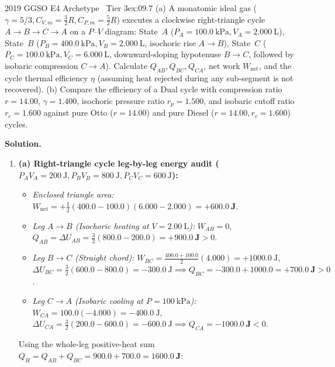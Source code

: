 \begin{workedexample}{2019 GGSO E4 Archetype \textbar\ Tier 3}{ex:09.7}
(a) A monatomic ideal gas ($\gamma = 5/3, C_{V,m} = \frac{3}{2}R, C_{P,m} = \frac{5}{2}R$) executes a clockwise right-triangle cycle $A\to B\to C\to A$ on a $P$--$V$ diagram: State~$A$ ($P_A = \SI{100.0}{\kilo\pascal}, V_A = \SI{2.000}{\liter}$), State~$B$ ($P_B = \SI{400.0}{\kilo\pascal}, V_B = \SI{2.000}{\liter}$, isochoric rise $A\to B$), State~$C$ ($P_C = \SI{100.0}{\kilo\pascal}, V_C = \SI{6.000}{\liter}$, downward-sloping hypotenuse $B\to C$, followed by isobaric compression $C\to A$). Calculate $Q_{AB}, Q_{BC}, Q_{CA}$, net work $W_{\mathrm{net}}$, and the cycle thermal efficiency $\eta$ (assuming heat rejected during any sub-segment is not recovered).
(b) Compare the efficiency of a Dual cycle with compression ratio $r = 14.00$, $\gamma = 1.400$, isochoric pressure ratio $r_p = 1.500$, and isobaric cutoff ratio $r_c = 1.600$ against pure Otto ($r=14.00$) and pure Diesel ($r=14.00, r_c=1.600$) cycles.
\par\smallskip\noindent
\textbf{Solution.}
\begin{enumerate}
  \item \textbf{(a) Right-triangle cycle leg-by-leg energy audit ($P_A V_A = \SI{200}{\joule}, P_B V_B = \SI{800}{\joule}, P_C V_C = \SI{600}{\joule}$):}
  \begin{itemize}
    \item \emph{Enclosed triangle area:} $W_{\mathrm{net}} = +\frac{1}{2}(400.0 - 100.0)(6.000 - 2.000) = \mathbf{+\SI{600.0}{\joule}}$.
    \item \emph{Leg $A\to B$ (Isochoric heating at $V=\SI{2.00}{\liter}$):} $W_{AB} = 0$, $Q_{AB} = \Delta U_{AB} = \frac{3}{2}(800.0 - 200.0) = \mathbf{+\SI{900.0}{\joule}} > 0$.
    \item \emph{Leg $B\to C$ (Straight chord):} $W_{BC} = \frac{400.0+100.0}{2}(4.000) = +\SI{1000.0}{\joule}$, $\Delta U_{BC} = \frac{3}{2}(600.0 - 800.0) = -\SI{300.0}{\joule} \implies Q_{BC} = -300.0 + 1000.0 = \mathbf{+\SI{700.0}{\joule}} > 0$.
    \item \emph{Leg $C\to A$ (Isobaric cooling at $P=\SI{100}{\kilo\pascal}$):} $W_{CA} = 100.0(-4.000) = -\SI{400.0}{\joule}$, $\Delta U_{CA} = \frac{3}{2}(200.0 - 600.0) = -\SI{600.0}{\joule} \implies Q_{CA} = \mathbf{\SI{-1000.0}{\joule}} < 0$.
  \end{itemize}
  Using the whole-leg positive-heat sum $Q_H = Q_{AB} + Q_{BC} = 900.0 + 700.0 = \mathbf{\SI{1600.0}{\joule}}$:

\end{enumerate}
\end{workedexample}
